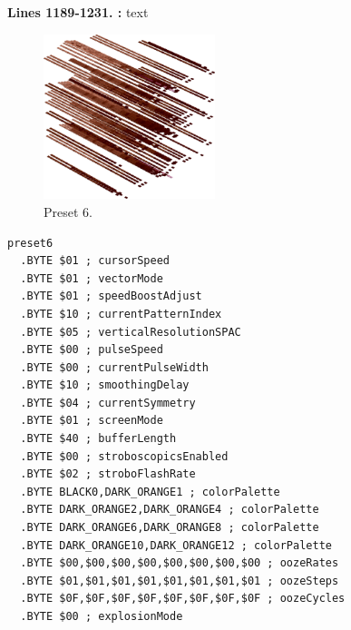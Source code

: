 \textbf{Lines 1189-1231. :} 
text
\clearpage

\clearpage
\begin{minipage}[b]{0.48\linewidth}
\begin{figure}[H]                                                          
  \centering                                                             
  \begin{adjustbox}{width=5cm,center}                                   
  \includegraphics[width=5cm]{src/colorspace_presets/preset6-45.png}%
  \end{adjustbox}                                                        
\caption*{Preset 6.}                                           
\end{figure}                                                               
\end{minipage}
\hspace{0.1cm}
\begin{minipage}[b]{0.48\linewidth}                            
\begin{lstlisting}[basicstyle=\ttfamily\tiny]
preset6
  .BYTE $01 ; cursorSpeed
  .BYTE $01 ; vectorMode
  .BYTE $01 ; speedBoostAdjust
  .BYTE $10 ; currentPatternIndex
  .BYTE $05 ; verticalResolutionSPAC
  .BYTE $00 ; pulseSpeed
  .BYTE $00 ; currentPulseWidth
  .BYTE $10 ; smoothingDelay
  .BYTE $04 ; currentSymmetry
  .BYTE $01 ; screenMode
  .BYTE $40 ; bufferLength
  .BYTE $00 ; stroboscopicsEnabled
  .BYTE $02 ; stroboFlashRate
  .BYTE BLACK0,DARK_ORANGE1 ; colorPalette
  .BYTE DARK_ORANGE2,DARK_ORANGE4 ; colorPalette
  .BYTE DARK_ORANGE6,DARK_ORANGE8 ; colorPalette
  .BYTE DARK_ORANGE10,DARK_ORANGE12 ; colorPalette
  .BYTE $00,$00,$00,$00,$00,$00,$00,$00 ; oozeRates
  .BYTE $01,$01,$01,$01,$01,$01,$01,$01 ; oozeSteps
  .BYTE $0F,$0F,$0F,$0F,$0F,$0F,$0F,$0F ; oozeCycles
  .BYTE $00 ; explosionMode
\end{lstlisting}
\end{minipage}

\vspace*{0.2cm}

